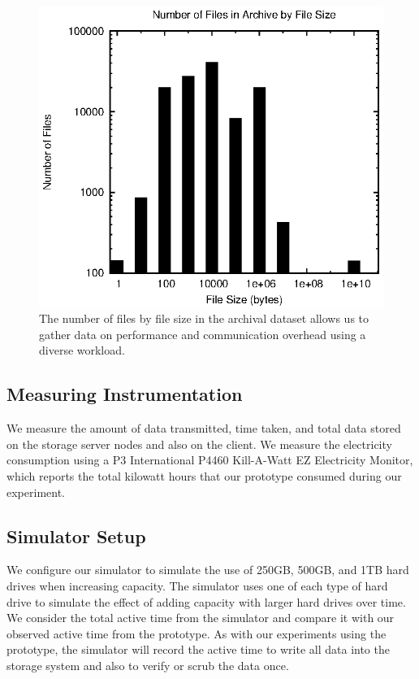 \begin{figure}[!ht]
\includegraphics[width=\linewidth]{fig5.eps}
\caption{The number of files by file size in the archival dataset allows us to gather data on performance and communication overhead using a diverse workload.}
\label{fig5}
\end{figure}

\subsection{Measuring Instrumentation}
We measure the amount of data transmitted, time taken, and total data stored on the storage server nodes and also on the client.  We measure the electricity consumption using a  P3 International P4460 Kill-A-Watt EZ Electricity Monitor, which reports the total kilowatt hours that our prototype consumed during our experiment.

\subsection{Simulator Setup}
We configure our simulator to simulate the use of 250GB, 500GB, and 1TB hard drives when increasing capacity.  The simulator uses one of each type of hard drive to simulate the effect of adding capacity with larger hard drives over time.  We consider the total active time from the simulator and compare it with our observed active time from the prototype.  As with our experiments using the prototype, the simulator will record the active time to write all data into the storage system and also to verify or scrub the data once.


